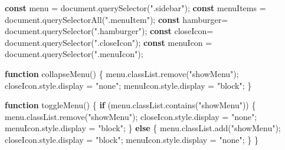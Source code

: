 \documentclass[
]{article}
\newenvironment{Shaded}{}{}
\newcommand{\AttributeTok}[1]{\textcolor[rgb]{0.49,0.56,0.16}{#1}}
\newcommand{\BuiltInTok}[1]{\textcolor[rgb]{0.00,0.50,0.00}{#1}}
\newcommand{\ControlFlowTok}[1]{\textcolor[rgb]{0.00,0.44,0.13}{\textbf{#1}}}
\newcommand{\FunctionTok}[1]{\textcolor[rgb]{0.02,0.16,0.49}{#1}}
\newcommand{\KeywordTok}[1]{\textcolor[rgb]{0.00,0.44,0.13}{\textbf{#1}}}
\newcommand{\NormalTok}[1]{#1}
\newcommand{\OperatorTok}[1]{\textcolor[rgb]{0.40,0.40,0.40}{#1}}
\newcommand{\StringTok}[1]{\textcolor[rgb]{0.25,0.44,0.63}{#1}}
\begin{document}
\begin{Shaded}
\begin{Highlighting}[numbers=left,,]
\KeywordTok{const}\NormalTok{ menu }\OperatorTok{=} \BuiltInTok{document}\OperatorTok{.}\FunctionTok{querySelector}\NormalTok{(}\StringTok{".sidebar"}\NormalTok{)}\OperatorTok{;}
\KeywordTok{const}\NormalTok{ menuItems }\OperatorTok{=} \BuiltInTok{document}\OperatorTok{.}\FunctionTok{querySelectorAll}\NormalTok{(}\StringTok{".menuItem"}\NormalTok{)}\OperatorTok{;}
\KeywordTok{const}\NormalTok{ hamburger}\OperatorTok{=} \BuiltInTok{document}\OperatorTok{.}\FunctionTok{querySelector}\NormalTok{(}\StringTok{".hamburger"}\NormalTok{)}\OperatorTok{;}
\KeywordTok{const}\NormalTok{ closeIcon}\OperatorTok{=} \BuiltInTok{document}\OperatorTok{.}\FunctionTok{querySelector}\NormalTok{(}\StringTok{".closeIcon"}\NormalTok{)}\OperatorTok{;}
\KeywordTok{const}\NormalTok{ menuIcon }\OperatorTok{=} \BuiltInTok{document}\OperatorTok{.}\FunctionTok{querySelector}\NormalTok{(}\StringTok{".menuIcon"}\NormalTok{)}\OperatorTok{;}

\KeywordTok{function} \FunctionTok{collapseMenu}\NormalTok{() \{}
\NormalTok{  menu}\OperatorTok{.}\AttributeTok{classList}\OperatorTok{.}\FunctionTok{remove}\NormalTok{(}\StringTok{"showMenu"}\NormalTok{)}\OperatorTok{;}
\NormalTok{  closeIcon}\OperatorTok{.}\AttributeTok{style}\OperatorTok{.}\AttributeTok{display} \OperatorTok{=} \StringTok{"none"}\OperatorTok{;}
\NormalTok{  menuIcon}\OperatorTok{.}\AttributeTok{style}\OperatorTok{.}\AttributeTok{display} \OperatorTok{=} \StringTok{"block"}\OperatorTok{;}
\NormalTok{\}}

\KeywordTok{function} \FunctionTok{toggleMenu}\NormalTok{() \{}
  \ControlFlowTok{if}\NormalTok{ (menu}\OperatorTok{.}\AttributeTok{classList}\OperatorTok{.}\FunctionTok{contains}\NormalTok{(}\StringTok{"showMenu"}\NormalTok{)) \{}
\NormalTok{    menu}\OperatorTok{.}\AttributeTok{classList}\OperatorTok{.}\FunctionTok{remove}\NormalTok{(}\StringTok{"showMenu"}\NormalTok{)}\OperatorTok{;}
\NormalTok{    closeIcon}\OperatorTok{.}\AttributeTok{style}\OperatorTok{.}\AttributeTok{display} \OperatorTok{=} \StringTok{"none"}\OperatorTok{;}
\NormalTok{    menuIcon}\OperatorTok{.}\AttributeTok{style}\OperatorTok{.}\AttributeTok{display} \OperatorTok{=} \StringTok{"block"}\OperatorTok{;}
\NormalTok{  \} }\ControlFlowTok{else}\NormalTok{ \{}
\NormalTok{    menu}\OperatorTok{.}\AttributeTok{classList}\OperatorTok{.}\FunctionTok{add}\NormalTok{(}\StringTok{"showMenu"}\NormalTok{)}\OperatorTok{;}
\NormalTok{    closeIcon}\OperatorTok{.}\AttributeTok{style}\OperatorTok{.}\AttributeTok{display} \OperatorTok{=} \StringTok{"block"}\OperatorTok{;}
\NormalTok{    menuIcon}\OperatorTok{.}\AttributeTok{style}\OperatorTok{.}\AttributeTok{display} \OperatorTok{=} \StringTok{"none"}\OperatorTok{;}
\NormalTok{  \}}
\NormalTok{\}}


\end{Highlighting}
\end{Shaded}
\end{document}

